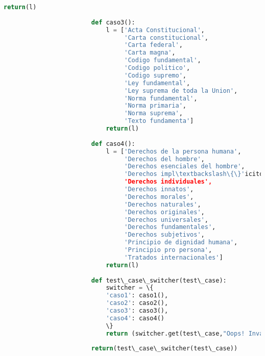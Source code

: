 \documentclass[12pt]{article}
\begin{document}
\begin{lstlisting}[language=Python, caption= Clase loads]
							return(l)
				
				        def caso3():
				            l = ['Acta Constitucional',
				                 'Carta constitucional',
				                 'Carta federal',
				                 'Carta magna',
				                 'Codigo fundamental',
				                 'Codigo politico',
				                 'Codigo supremo',
				                 'Ley fundamental',
				                 'Ley suprema de toda la Union',
				                 'Norma fundamental',
				                 'Norma primaria',
				                 'Norma suprema',
				                 'Texto fundamenta']
				            return(l)
				
				        def caso4():
				            l = ['Derechos de la persona humana',
				                 'Derechos del hombre',
				                 'Derechos esenciales del hombre',
				                 'Derechos impl\textbackslash\{\}'icitos',
				                 'Derechos individuales',
				                 'Derechos innatos',
				                 'Derechos morales',
				                 'Derechos naturales',
				                 'Derechos originales',
				                 'Derechos universales',
				                 'Derechos fundamentales',
				                 'Derechos subjetivos',
				                 'Principio de dignidad humana',
				                 'Principio pro persona',
				                 'Tratados internacionales']
				            return(l)
				
				        def test\_case\_switcher(test\_case):
				            switcher = \{
				            'caso1': caso1(),
				            'caso2': caso2(),
				            'caso3': caso3(),
				            'caso4': caso4()
				            \}
				            return (switcher.get(test\_case,"Oops! Invalid Option"))
				        
				        return(test\_case\_switcher(test\_case))
	\end{lstlisting}		
	
\end{document}
